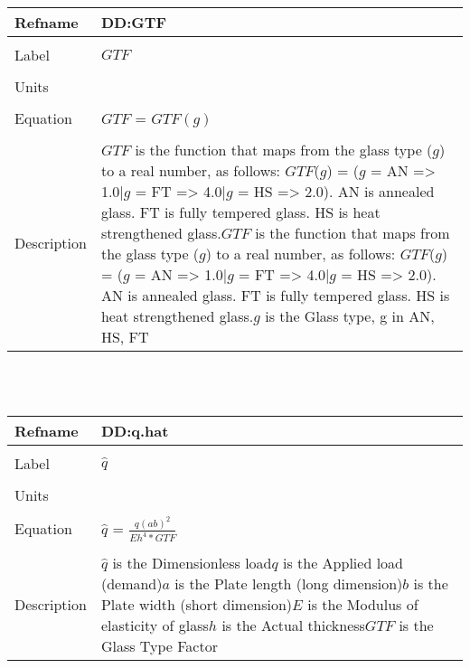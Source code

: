 \documentclass[12pt]{article}
\begin{document}
~\newline
\noindent \begin{minipage}{\textwidth}
\begin{tabular}{p{} p{}}
\toprule \textbf{Refname} & \textbf{DD:GTF}
\label{DD:GTF}
\\ \midrule \\
Label & $GTF$
\\ \midrule \\
Units & 
\\ \midrule \\
Equation & $GTF$ = $GTF(g)$
\\ \midrule \\
Description & $GTF$ is the function that maps from the glass type ($g$) to a real number, as follows: $GTF$($g$) = ($g$ = AN => 1.0|$g$ = FT => 4.0|$g$ = HS => 2.0). AN is annealed glass. FT is fully tempered glass. HS is heat strengthened glass.\newline$GTF$ is the function that maps from the glass type ($g$) to a real number, as follows: $GTF$($g$) = ($g$ = AN => 1.0|$g$ = FT => 4.0|$g$ = HS => 2.0). AN is annealed glass. FT is fully tempered glass. HS is heat strengthened glass.\newline$g$ is the Glass type, g in {AN, HS, FT}
\\ \bottomrule \end{tabular}
\end{minipage}\\
~\newline
\noindent \begin{minipage}{\textwidth}
\begin{tabular}{p{} p{}}
\toprule \textbf{Refname} & \textbf{DD:q.hat}
\label{DD:q.hat}
\\ \midrule \\
Label & $\hat{q}$
\\ \midrule \\
Units & 
\\ \midrule \\
Equation & $\hat{q}$ = $\frac{q(ab)^{2}}{Eh^{4}*GTF}$
\\ \midrule \\
Description & $\hat{q}$ is the Dimensionless load\newline$q$ is the Applied load (demand)\newline$a$ is the Plate length (long dimension)\newline$b$ is the Plate width (short dimension)\newline$E$ is the Modulus of elasticity of glass\newline$h$ is the Actual thickness\newline$GTF$ is the Glass Type Factor
\\ \bottomrule \end{tabular}
\end{minipage}\\
\end{document}
